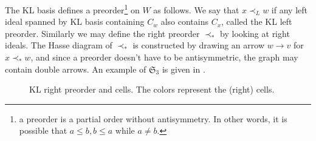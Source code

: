 The KL basis defines a preorder\footnote{a preorder is a partial order without antisymmetry. In other words, it is possible that $a\leq b,b\leq a$ while $a\neq b$.} on $W$ as follows. We say that $x\prec_L w$ if any left ideal spanned by KL basis containing $C_w$ also contains $C_x$, called the KL left preorder. Similarly we may define the right preorder $\prec_*$ by looking at right ideals. The Hasse diagram of $\prec_*$ is constructed by drawing an arrow $w\to v$ for $x\prec_{*} w$, and since a preorder doesn't have to be antisymmetric, the graph may contain double arrows. An example of $\mathfrak{S}_3$ is given in .

\begin{figure}[h]
	\begin{center}
    \quad\quad

\end{center}
\caption{KL right preorder and cells. The colors represent the (right) cells.}
\label{fg:KL_cells_S3}
\end{figure}

